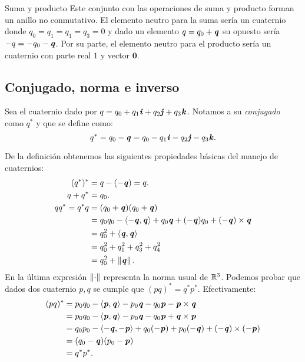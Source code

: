 \begin{subsection}{Suma y producto}
			Este conjunto con las operaciones de suma y producto forman un anillo no conmutativo. El elemento neutro para la suma sería un cuaternio donde $ q_0 = q_1 = q_1 = q_3 = 0 $ y dado un elemento $  q = q_0 + \textbf{\emph{q}} $ su opuesto sería $ -q = -q_0-\textbf{\emph{q}}  $. Por su parte, el elemento neutro para el producto sería un cuaternio con parte real $ 1 $ y vector $ \mathbf{0} $.
		\end{subsection}
	
		\subsection{Conjugado, norma e inverso}
			Sea el cuaternio dado por $ q = q_0 + q_1 \textbf{\emph{i}} + q_2 \textbf{\emph{j}} + q_3 \textbf{\emph{k}} $. Notamos a su \textit{conjugado} como $ q^* $ y que se define como:
			\[
			q^* = q_0 - \textbf{\emph{q}} = q_0 - q_1 \textbf{\emph{i}} - q_2 \textbf{\emph{j}} - q_3 \textbf{\emph{k}}.
			\]
			
			De la definición obtenemos las siguientes propiedades básicas del manejo de cuaternios:
			\begin{equation*}
			\begin{split}
			(q^*)^* &= q - (-\textbf{\emph{q}}) = q.\\
			q + q^* &= q_0.\\
			 q q^*= q^*q & = (q_0+\textbf{\emph{q}})(q_0+\textbf{\emph{q}}) \\
			&= q_0q_0 - \langle-\textbf{\emph{q}}, \textbf{\emph{q}} \rangle + q_0\textbf{\emph{q}} + (-\textbf{\emph{q}})q_0 + (-\textbf{\emph{q}}) \times \textbf{\emph{q}} \\
			&= q_0^2 + \langle\textbf{\emph{q}} , \textbf{\emph{q}} \rangle\\
			&= q_0^2 + q_1^2 + q_3^2 + q_4^2 \\
			& = q_0^2 + \left\Vert\textbf{\emph{q}}\right\Vert.
			\end{split}
			\end{equation*}
			En la última expresión $ \left\Vert\cdot\right\Vert $ representa la norma usual de $ \mathbb{R}^3 $. Podemos probar que dados dos cuaternio $ p,q $ se cumple que $ (pq)^* = q^*p^* $. Efectivamente:
			\begin{equation*}
			\begin{split}
			(pq)^* &= p_0q_0 - \langle \textbf{\emph{p}} , \textbf{\emph{q}} \rangle - p_0\textbf{\emph{q}} - q_0\textbf{\emph{p}} - \textbf{\emph{p}} \times \textbf{\emph{q}} \\
			 &= p_0q_0 - \langle \textbf{\emph{p}} , \textbf{\emph{q}} \rangle - p_0\textbf{\emph{q}} - q_0\textbf{\emph{p}} + \textbf{\emph{q}} \times \textbf{\emph{p}} \\
			 &= q_0p_0 - \langle -\textbf{\emph{q}} , -\textbf{\emph{p}} \rangle + q_0(-\textbf{\emph{p}})+p_0(-\textbf{\emph{q}}) + (-\textbf{\emph{q}}) \times (-\textbf{\emph{p}})\\
			 &= (q_0-\textbf{\emph{q}})(p_0-\textbf{\emph{p}})\\
			 &= q^* p^*.
			\end{split}
			\end{equation*}
			

